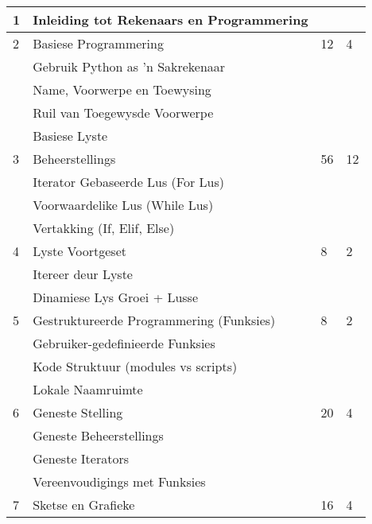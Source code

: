 \begin{longtable}{|p{1.4cm}|p{8.4cm}|p{2.2cm}|p{1.8cm}|}
             1  & Inleiding tot Rekenaars en Programmering     &    &    \\
             \hline
             2  & Basiese Programmering                        & 12 & 4  \\
                & \qquad Gebruik Python as 'n Sakrekenaar      &    &    \\
                & \qquad Name, Voorwerpe en Toewysing          &    &    \\
                & \qquad Ruil van Toegewysde Voorwerpe         &    &    \\
                & \qquad Basiese Lyste                         &    &    \\
             \hline
             3  & Beheerstellings                              & 56 & 12 \\
                & \qquad Iterator Gebaseerde Lus  (For Lus)    &    &    \\
                & \qquad Voorwaardelike Lus  (While Lus)       &    &    \\
                & \qquad Vertakking (If, Elif, Else)           &    &    \\
             \hline
             4  & Lyste Voortgeset                             & 8  & 2  \\
                & \qquad Itereer deur Lyste                    &    &    \\
                & \qquad Dinamiese Lys Groei + Lusse           &    &    \\
             \hline
             5  & Gestruktureerde Programmering (Funksies)     & 8  & 2  \\
                & \qquad Gebruiker-gedefinieerde Funksies      &    &    \\
                & \qquad Kode Struktuur  (modules vs scripts)  &    &    \\
                & \qquad Lokale Naamruimte                     &    &    \\
             \hline
             6  & Geneste Stelling                             & 20 & 4  \\
                & \qquad Geneste Beheerstellings               &    &    \\
                & \qquad Geneste Iterators                     &    &    \\
                & \qquad Vereenvoudigings met Funksies         &    &    \\
             \hline
             7  & Sketse en Grafieke                           & 16 & 4  \\

\end{longtable}
